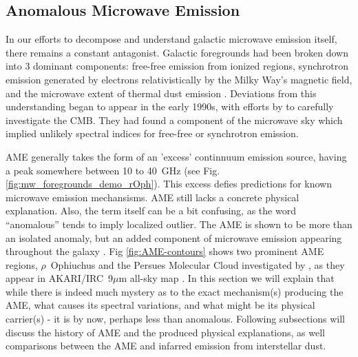   \subsection{Anomalous Microwave Emission}

      In our efforts to decompose and understand galactic microwave emission itself, there remains a constant antagonist. Galactic foregrounds had been broken down into 3 dominant components: free-free emission from ionized regions, synchrotron emission generated by electrons relativistically by the Milky Way's magnetic field, and the microwave extent of thermal dust emission \citep{wmap03b, leach08, planckXII}. Deviations from this understanding began to appear in the early 1990s, with efforts by \cite{kogut96, leitch97} to carefully investigate the CMB. They had found a component of the microwave sky which implied unlikely spectral indices for free-free or synchrotron emission.

        AME generally takes the form of an 'excess' continnuum emission source, having a peak somewhere between 10 to 40~GHz (see Fig. \ref{fig:mw_foregrounds_demo_rOph}). This excess defies predictions for known microwave emission mechansisms. AME still lacks a concrete physical explanation. Also, the term itself can be a bit confusing, as the word ``anomalous'' tends to imply localized outlier. The AME is shown to be more than an isolated anomaly, but an added component of microwave emission appearing throughout the galaxy \citep{deoliveiracosta97,wmap03b,dickinson13r}. Fig \ref{fig:AME-contours} shows two prominent AME regions, $\rho{}$~Ophiuchus and the Persues Molecular Cloud investigated by \cite{tibbs11,planckxx11}, as they appear in AKARI/IRC~9$\mu$m all-sky map \citep{ishihara10}.
        In this section we will explain that while there is indeed much mystery as to the exact mechanism(s) producing the AME, what causes its spectral variations, and what might be its physical carrier(s) - it is by now, perhaps less than anomalous. Following subsections will discuss the history of AME and the produced physical explanations, as well comparisons between the AME and infarred emission from interstellar dust.

